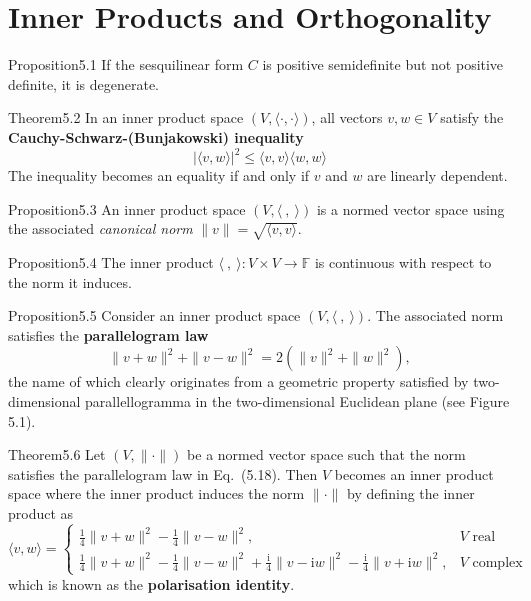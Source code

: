 \section{Inner Products and Orthogonality}

\begin{res}{Proposition}{5.1}
If the sesquilinear form $C$ is positive semidefinite but not positive definite, it is degenerate.
\end{res}

\begin{res}{Theorem}{5.2}
In an inner product space $(V,\langle\cdot,\cdot\rangle)$, all vectors $v,w\in V$ satisfy the \textbf{Cauchy-Schwarz-(Bunjakowski) inequality}
\begin{equation}|\langle v,w\rangle|^2\le\langle v,v\rangle\langle w,w\rangle\tag{5.9}\end{equation}
The inequality becomes an equality if and only if $v$ and $w$ are linearly dependent.
\end{res}

\begin{res}{Proposition}{5.3}
An inner product space $(V,\langle\ ,\ \rangle)$ is a normed vector space using the associated \textit{canonical norm} $\|v\|=\sqrt{\langle v,v\rangle}$.
\end{res}

\begin{res}{Proposition}{5.4}
The inner product $\langle\ ,\ \rangle:V\times V\to\mathbb F$ is continuous with respect to the norm it induces.
\end{res}

\begin{res}{Proposition}{5.5}
Consider an inner product space $(V,\langle\ ,\ \rangle)$. The associated norm satisfies the \textbf{parallelogram law}
\begin{equation}\|v+w\|^2+\|v-w\|^2=2(\|v\|^2+\|w\|^2),\tag{5.18}\end{equation}
the name of which clearly originates from a geometric property satisfied by two-dimensional parallellogramma in the two-dimensional Euclidean plane (see Figure 5.1).
\end{res}

\begin{res}{Theorem}{5.6}
Let $(V,\|\cdot\|)$ be a normed vector space such that the norm satisfies the parallelogram law in Eq.~(5.18). Then $V$ becomes an inner product space where the inner product induces the norm $\|\cdot\|$ by defining the inner product as
\begin{equation}\langle v,w\rangle=\begin{cases}\tfrac14\|v+w\|^2-\tfrac14\|v-w\|^2,&V\text{ real}\\[2pt]\tfrac14\|v+w\|^2-\tfrac14\|v-w\|^2+\tfrac{\mathrm i}4\|v-\mathrm iw\|^2-\tfrac{\mathrm i}4\|v+\mathrm iw\|^2,&V\text{ complex}\end{cases}\tag{5.19}\end{equation}
which is known as the \textbf{polarisation identity}.
\end{res}

